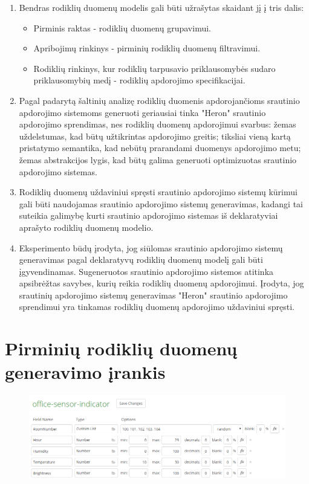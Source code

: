 \documentclass{VUMIFPSbakalaurinis}
\begin{document}
\begin{enumerate}
    \item Bendras rodiklių duomenų modelis gali būti užrašytas skaidant jį į tris dalis:
    \begin{itemize}
        \item Pirminis raktas - rodiklių duomenų grupavimui.
        \item Apribojimų rinkinys - pirminių rodiklių duomenų filtravimui.
        \item Rodiklių rinkinys, kur rodiklių tarpusavio priklausomybės sudaro priklausomybių medį - rodiklių apdorojimo specifikacijai.
    \end{itemize}
    \item Pagal padarytą šaltinių analizę rodiklių duomenis apdorojančioms srautinio apdorojimo sistemoms generuoti geriausiai tinka "Heron" srautinio apdorojimo sprendimas, nes rodiklių duomenų apdorojimui svarbus: žemas uždelstumas, kad būtų užtikrintas apdorojimo greitis; tiksliai vieną kartą pristatymo semantika, kad nebūtų prarandami duomenys apdorojimo metu; žemas abstrakcijos lygis, kad būtų galima generuoti optimizuotas srautinio apdorojimo sistemas.
    \item Rodiklių duomenų uždaviniui spręsti srautinio apdorojimo sistemų kūrimui gali būti naudojamas srautinio apdorojimo sistemų generavimas, kadangi tai suteikia galimybę kurti srautinio apdorojimo sistemas iš deklaratyviai aprašyto rodiklių duomenų modelio.
    \item Eksperimento būdų įrodyta, jog siūlomas srautinio apdorojimo sistemų generavimas pagal deklaratyvų rodiklių duomenų modelį gali būti įgyvendinamas. Sugeneruotos srautinio apdorojimo sistemos atitinka apsibrėžtas savybes, kurių reikia rodiklių duomenų apdorojimui. Įrodyta, jog srautinių apdorojimo sistemų generavimas "Heron" srautinio apdorojimo sprendimui yra tinkamas rodiklių duomenų apdorojimo uždaviniui spręsti.  
\end{enumerate}

\printbibliography[heading=bibintoc] 

\appendix 

\section{Pirminių rodiklių duomenų generavimo įrankis}\label{add:mockaroo}
\begin{figure}[H]
    \centering
    \includegraphics[width=1\textwidth]{img/generated-data.png}
    \label{img:generated-data}
\end{figure}
\end{document}
